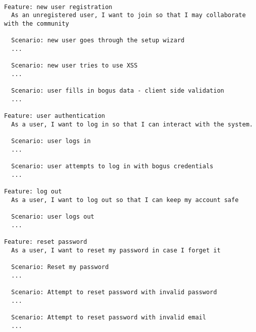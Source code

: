 \begin{verbatim}

Feature: new user registration
  As an unregistered user, I want to join so that I may collaborate with the community

  Scenario: new user goes through the setup wizard
  ...

  Scenario: new user tries to use XSS
  ...

  Scenario: user fills in bogus data - client side validation
  ...

Feature: user authentication
  As a user, I want to log in so that I can interact with the system.

  Scenario: user logs in
  ...

  Scenario: user attempts to log in with bogus credentials
  ...

Feature: log out
  As a user, I want to log out so that I can keep my account safe

  Scenario: user logs out
  ...

Feature: reset password
  As a user, I want to reset my password in case I forget it

  Scenario: Reset my password
  ...

  Scenario: Attempt to reset password with invalid password
  ...
  
  Scenario: Attempt to reset password with invalid email
  ...

\end{verbatim}



